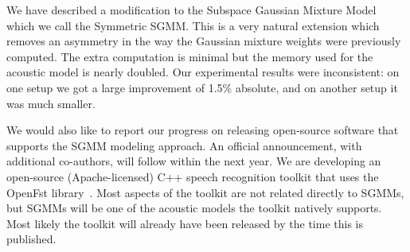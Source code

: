 \documentclass{article}
\begin{document}
We have described a modification to the Subspace Gaussian Mixture Model which we
call the Symmetric SGMM.  This is a very natural extension which removes an
asymmetry in the way the Gaussian mixture weights were previously computed.  The
extra computation is minimal but the memory used for the acoustic model is nearly
doubled.  Our experimental results were inconsistent: on one setup we got a large
improvement of 1.5\% absolute, and on another setup it was much smaller. 

We would also like to report our progress on releasing open-source software that
supports the SGMM modeling approach.  An official announcement, with additional
co-authors, will follow within the next year.  We are developing an open-source
(Apache-licensed) C++ speech recognition toolkit that uses the OpenFst
library~\cite{openfst}.  Most aspects of the toolkit are not related directly to
SGMMs, but SGMMs will be one of the acoustic models the toolkit natively
supports.  Most likely the toolkit will already have been released by the time this 
is published.



\end{document}
